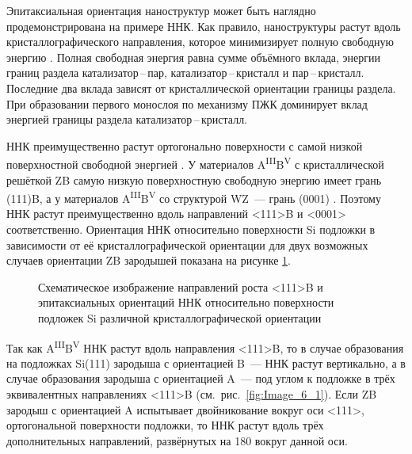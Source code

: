 Эпитаксиальная ориентация наноструктур может быть наглядно продемонстрирована
на примере ННК. Как правило, наноструктуры растут вдоль кристаллографического
направления, которое минимизирует полную свободную энергию \cite{Wagner1964}.
Полная свободная энергия равна сумме объёмного вклада, энергии границ раздела
катализатор\,--\,пар, катализатор\,--\,кристалл и пар\,--\,кристалл. Последние
два вклада зависят от кристаллической ориентации границы раздела. При
образовании первого монослоя по механизму ПЖК доминирует вклад энергией границы
раздела катализатор\,--\,кристалл.

ННК преимущественно растут ортогонально поверхности с самой низкой
поверхностной свободной энергией \cite{Wagner1964}. У материалов
A\textsuperscript{III}B\textsuperscript{V} с кристаллической решёткой ZB самую
низкую поверхностную свободную энергию имеет грань (111)B, а у материалов
A\textsuperscript{III}B\textsuperscript{V} со структурой WZ~--- грань (0001)
\cite{Fortuna2010}. Поэтому ННК растут преимущественно вдоль направлений <111>B
и <0001> соответственно. Ориентация ННК относительно поверхности Si подложки в
зависимости от её кристаллографической ориентации для двух возможных случаев
ориентации ZB зародышей показана на рисунке \cref{fig:Image_6}.

\begin{figure}[ht]   \caption{Схематическое
			изображение направлений роста <111>B и эпитаксиальных ориентаций ННК
			относительно поверхности подложек Si различной кристаллографической
	ориентации}\label{fig:Image_6} \end{figure}

Так как A\textsuperscript{III}B\textsuperscript{V} ННК растут вдоль направления
<111>B, то в случае образования на подложках Si(111) зародыша с ориентацией
B~--- ННК растут вертикально, а в случае образования зародыша с ориентацией
A~--- под углом к подложке в трёх эквивалентных направлениях <111>B
(см.~рис.~\cref{fig:Image_6_1}). Если ZB зародыш с ориентацией A испытывает
двойникование вокруг оси <111>, ортогональной поверхности подложки, то ННК
растут вдоль трёх дополнительных направлений, развёрнутых на 180\textdegree
 вокруг данной оси.

